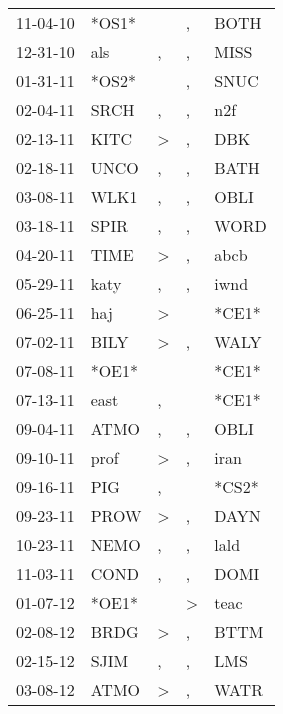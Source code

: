 \begin{supertabular}{lllll}
 11-04-10 &  *OS1* &                  &                , &   BOTH \\
 12-31-10 &    als &                , &                , &   MISS \\
 01-31-11 &  *OS2* &                  &                , &   SNUC \\
 02-04-11 &   SRCH &                , &                , &    n2f \\
 02-13-11 &   KITC &     \textgreater &                , &    DBK \\
 02-18-11 &   UNCO &                , &                , &   BATH \\
 03-08-11 &   WLK1 &                , &                , &   OBLI \\
 03-18-11 &   SPIR &                , &                , &   WORD \\
 04-20-11 &   TIME &     \textgreater &                , &   abcb \\
 05-29-11 &   katy &                , &                , &   iwnd \\
 06-25-11 &    haj &     \textgreater &                  &  *CE1* \\
 07-02-11 &   BILY &     \textgreater &                , &   WALY \\
 07-08-11 &  *OE1* &                  &                  &  *CE1* \\
 07-13-11 &   east &                , &                  &  *CE1* \\
 09-04-11 &   ATMO &                , &                , &   OBLI \\
 09-10-11 &   prof &     \textgreater &                , &   iran \\
 09-16-11 &    PIG &                , &                  &  *CS2* \\
 09-23-11 &   PROW &     \textgreater &                , &   DAYN \\
 10-23-11 &   NEMO &                , &                , &   lald \\
 11-03-11 &   COND &                , &                , &   DOMI \\
 01-07-12 &  *OE1* &                  &     \textgreater &   teac \\
 02-08-12 &   BRDG &     \textgreater &                , &   BTTM \\
 02-15-12 &   SJIM &                , &                , &    LMS \\
 03-08-12 &   ATMO &     \textgreater &                , &   WATR \\

\end{supertabular}
